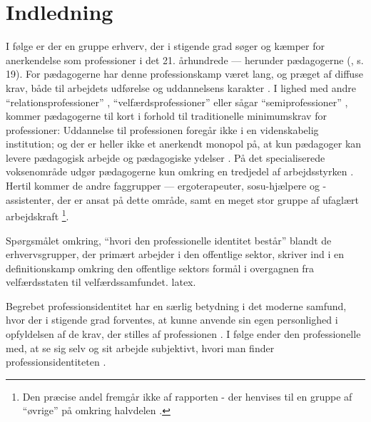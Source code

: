 \section{Indledning}

I følge \citeauthor{hansbolKonstruktionAfProfessionel2008} er der en gruppe erhverv, der i stigende grad søger og kæmper for anerkendelse som professioner i det 21. århundrede — herunder pædagogerne (\citeyear{hansbolKonstruktionAfProfessionel2008}, s. 19).
For pædagogerne har denne professionskamp været lang, og præget af diffuse krav, både til arbejdets udførelse og uddannelsens karakter \autocite[ss. 48-51]{kofodBornepolitikkenOgUdviklingen2007}.
I lighed med andre “relationsprofessioner” \autocite{moosRelationsprofessionerLaererePaedagoger2008}, “velfærdsprofessioner” \autocite{frederiksenVelfaerdsprofessionerMellemOmsorg2017} eller sågar “semiprofessioner”\autocite{kofodBornepolitikkenOgUdviklingen2007} , kommer pædagogerne til kort i forhold til traditionelle minimumskrav for professioner:
Uddannelse til professionen foregår ikke i en videnskabelig institution; og der er heller ikke et anerkendt monopol på, at kun pædagoger kan levere pædagogisk arbejde og pædagogiske ydelser \autocite[s.53]{kofodBornepolitikkenOgUdviklingen2007}.
På det specialiserede voksenområde udgør pædagogerne kun omkring en tredjedel af arbejdsstyrken \autocite[ss. 8-9]{kommunerneslandsforeningFaktaOmKommunernes2019}.
Hertil kommer de andre faggrupper — ergoterapeuter, sosu-hjælpere og -assistenter, der er ansat på dette område, samt en meget stor gruppe af ufaglært arbejdskraft \footnote{Den præcise andel fremgår ikke af rapporten - der henvises til en gruppe af “øvrige” på omkring halvdelen \autocite[s. 8]{kommunerneslandsforeningFaktaOmKommunernes2019}.}.

Spørgsmålet omkring, “hvori den professionelle identitet består” blandt de erhvervsgrupper, der primært arbejder i den offentlige sektor, skriver \citeauthor{hansbolKonstruktionAfProfessionel2008} ind i en definitionskamp omkring den offentlige sektors formål i overgagnen fra velfærdsstaten til velfærdssamfundet.
latex\autocite[s. 19]{hansbolKonstruktionAfProfessionel2008}.

Begrebet professionsidentitet har en særlig betydning i det moderne samfund, hvor der i stigende grad forventes, at kunne anvende sin egen personlighed i opfyldelsen af de krav, der stilles af professionen \autocite{hansbolKonstruktionAfProfessionel2008}. I følge \citeauthor{mik-meyerIndledningSkabeProfessionel2012} ender den professionelle med, at se sig selv og sit arbejde subjektivt, hvori man finder professionsidentiteten \autocite[s. 458]{mik-meyerIndledningSkabeProfessionel2012}.

